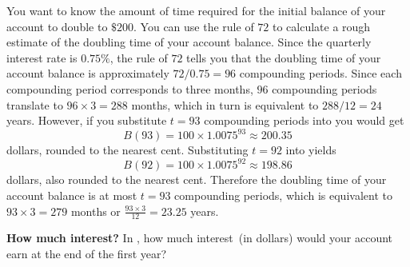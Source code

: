\documentclass[a4paper,oneside,12pt]{article}
\begin{document}
\begin{solution}
You want to know the amount of time required for the initial balance
of your account to double to $\$200$.  You can use the rule of $72$ to
calculate a rough estimate of the doubling time of your account
balance.  Since the quarterly interest rate is $0.75\%$, the rule of
$72$ tells you that the doubling time of your account balance is
approximately $72 / 0.75 = 96$ compounding periods.  Since each
compounding period corresponds to three months, $96$ compounding
periods translate to $96 \times 3 = 288$ months, which in turn is
equivalent to $288 / 12 = 24$ years.  However, if you substitute
$t = 93$ compounding periods into
 you would get
\[
B(93)
=
100 \times 1.0075^{93}
\approx
200.35
\]
dollars, rounded to the nearest cent.  Substituting $t = 92$ into
 yields
\[
B(92)
=
100 \times 1.0075^{92}
\approx
198.86
\]
dollars, also rounded to the nearest cent.  Therefore the doubling
time of your account balance is at most $t = 93$ compounding periods,
which is equivalent to $93 \times 3 = 279$ months or
$\frac{93 \times 3}{12} = 23.25$ years.
\end{solution}

\begin{exercise}
\textbf{How much interest?}
In , how much
interest~(in dollars) would your account earn at the end of the first
year?
\end{exercise}

\end{document}
